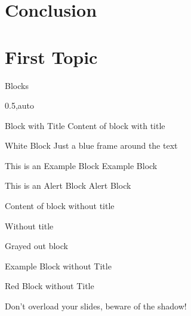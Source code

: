 \documentclass[english,aspectratio=43,t]{beamer}
\begin{document}
\section{Conclusion}
\label{sec:conclusion}


\section{First Topic}
\label{sec:first_topic}
\frame\sectionpage


\begin{frame}{Blocks}
	\begin{cols}{0.5,auto}
		\begin{block}{Block with Title}
			Content of block with title
		\end{block}
		\begin{whiteblock}{White Block}
			Just a blue frame around the text
		\end{whiteblock}
		\begin{exampleblock}{This is an Example Block}
			Example Block
		\end{exampleblock}
		\begin{alertblock}{This is an Alert Block}
			Alert Block
		\end{alertblock}
	\col
		\begin{block}{}
			Content of block without title
		\end{block}
		\begin{whiteblock}{}
			Without title
		\end{whiteblock}
		\begin{grayblock}{}
			Grayed out block
		\end{grayblock}
		\begin{exampleblock}{}
			Example Block without Title
		\end{exampleblock}
		\begin{redblock}{}
			Red Block without Title
		\end{redblock}
	\end{cols}
	\pushdown
	\begin{alertblock}{}
		\begin{center}Don't overload your slides, beware of the shadow!\end{center}
	\end{alertblock}
\end{frame}
\end{document}
